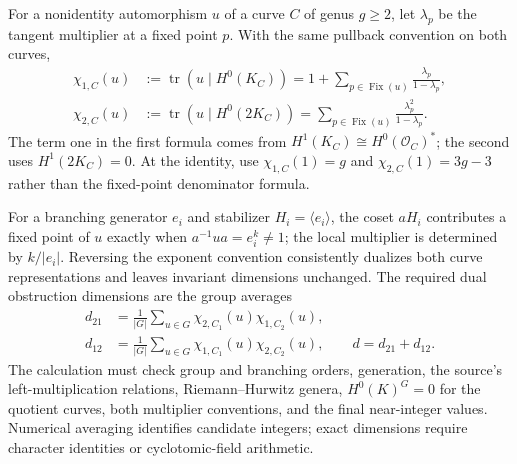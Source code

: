 \documentclass[a4paper,11pt]{article}
\numberwithin{equation}{section}
\theoremstyle{definition}
\newcommand{\tr}{\operatorname{tr}}
\begin{document}
For a nonidentity automorphism $u$ of a curve $C$ of genus $g\ge2$, let $\lambda_p$ be the tangent multiplier at a fixed point $p$. With the same pullback convention on both curves,
\begin{align*}
\chi_{1,C}(u)&:=\tr(u\mid H^0(K_C))
=1+\sum_{p\in\operatorname{Fix}(u)}\frac{\lambda_p}{1-\lambda_p},\\
\chi_{2,C}(u)&:=\tr(u\mid H^0(2K_C))
=\sum_{p\in\operatorname{Fix}(u)}\frac{\lambda_p^2}{1-\lambda_p}.
\end{align*}
The term one in the first formula comes from $H^1(K_C)\cong H^0(\mathcal O_C)^*$; the second uses $H^1(2K_C)=0$. At the identity, use $\chi_{1,C}(1)=g$ and $\chi_{2,C}(1)=3g-3$ rather than the fixed-point denominator formula.

For a branching generator $e_i$ and stabilizer $H_i=\langle e_i\rangle$, the coset $aH_i$ contributes a fixed point of $u$ exactly when $a^{-1}ua=e_i^k\ne1$; the local multiplier is determined by $k/|e_i|$. Reversing the exponent convention consistently dualizes both curve representations and leaves invariant dimensions unchanged. The required dual obstruction dimensions are the group averages
\begin{align*}
d_{21}&=\frac1{|G|}\sum_{u\in G}\chi_{2,C_1}(u)\chi_{1,C_2}(u),\\
d_{12}&=\frac1{|G|}\sum_{u\in G}\chi_{1,C_1}(u)\chi_{2,C_2}(u),\qquad
d=d_{21}+d_{12}.
\end{align*}
The calculation must check group and branching orders, generation, the source's left-multiplication relations, Riemann--Hurwitz genera, $H^0(K)^G=0$ for the quotient curves, both multiplier conventions, and the final near-integer values. Numerical averaging identifies candidate integers; exact dimensions require character identities or cyclotomic-field arithmetic.
\end{document}
